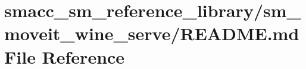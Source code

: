 \hypertarget{smacc__sm__reference__library_2sm__moveit__wine__serve_2README_8md}{}\section{smacc\+\_\+sm\+\_\+reference\+\_\+library/sm\+\_\+moveit\+\_\+wine\+\_\+serve/\+R\+E\+A\+D\+ME.md File Reference}
\label{smacc__sm__reference__library_2sm__moveit__wine__serve_2README_8md}
